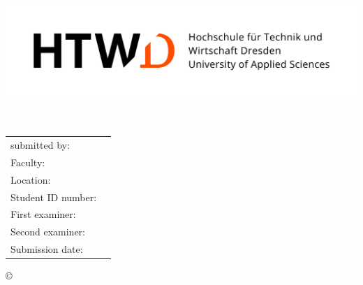 \thispagestyle{plain}
\begin{titlepage}
	\begin{center}
		\vspace*{2.5cm}
		\includegraphics[width=0.7\linewidth]{htwd_style/htwd_logo_cmyk_horizontal_color.jpg}\\[0.25cm]
		\LARGE{\textbf{\art}}\\[1.5ex]
		\large{\textbf{\titel}}\\[3.5ex]


		\normalsize
		\begin{tabular}{p{5.4cm}p{7cm}}\\
			submitted by:  & \quad \autor\\[1.2ex]
			Faculty: & \quad \studienbereich\\[1.2ex]
			Location: & \quad \ort\\[1.2ex]
			Student ID number: & \quad \matrikelnr\\[1.2ex]
			First examiner:  & \quad \erstgutachter\\[1.2ex]
			Second examiner: & \quad \zweitgutachter\\[8ex]
			Submission date:    & \quad \abgabedatum\\
		\end{tabular}
		
		\copyright\ \jahr\\[9ex]
	\end{center}
	
	
\end{titlepage}